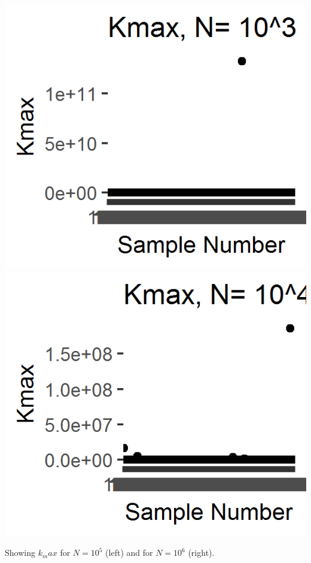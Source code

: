 \includegraphics{../images/Problem6_10^3.png}
\includegraphics{../images/Problem6_10^4.png}

Showing $k_max$ for $N = 10^5$ (left) and for $N = 10^6$ (right).

